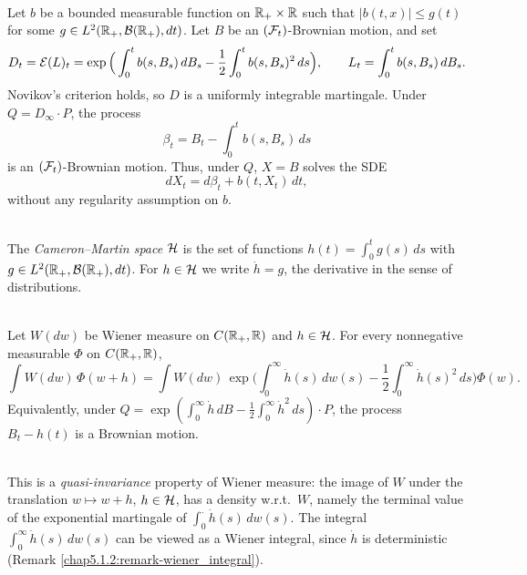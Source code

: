 \begin{proposition}\label{chap5.6:proposition-SDE_construction}
\\
Let $b$ be a bounded measurable function on $\mathbb{R}_+\times\mathbb{R}$ such that $|b(t,x)|\leq g(t)$ for some $g\in L^2(\mathbb{R}_+,\mathcal{B}(\mathbb{R}_+),dt)$. Let $B$ be an $(\mathcal{F}_t)$-Brownian motion, and set
$$D_t=\mathcal{E}(L)_t=\exp\Big(\int_0^tb(s,B_s)\,dB_s-\frac12\int_0^tb(s,B_s)^2\,ds\Big),\qquad L_t=\int_0^tb(s,B_s)\,dB_s.$$
Novikov's criterion holds, so $D$ is a uniformly integrable martingale. Under $Q=D_\infty\cdot P$, the process
$$\beta_t=B_t-\int_0^tb(s,B_s)\,ds$$
is an $(\mathcal{F}_t)$-Brownian motion. Thus, under $Q$, $X=B$ solves the SDE
$$dX_t=d\beta_t+b(t,X_t)\,dt,$$
without any regularity assumption on $b$.
\end{proposition}

\begin{definition}\label{chap5.6:definition-cameron_martin_space}
\\
The \textit{Cameron--Martin space} $\mathcal{H}$ is the set of functions $h(t)=\int_0^tg(s)\,ds$ with $g\in L^2(\mathbb{R}_+,\mathcal{B}(\mathbb{R}_+),dt)$. For $h\in\mathcal{H}$ we write $\dot h=g$, the derivative in the sense of distributions.
\end{definition}

\begin{proposition}\label{chap5.6:proposition-cameron_martin}
\\
Let $W(dw)$ be Wiener measure on $C(\mathbb{R}_+,\mathbb{R})$ and $h\in\mathcal{H}$. For every nonnegative measurable $\Phi$ on $C(\mathbb{R}_+,\mathbb{R})$,
$$\int W(dw)\,\Phi(w+h)=\int W(dw)\,\exp\Big(\int_0^\infty\dot h(s)\,dw(s)-\frac12\int_0^\infty\dot h(s)^2\,ds\Big)\Phi(w).$$
Equivalently, under $Q=\exp(\int_0^\infty\dot h\,dB-\frac12\int_0^\infty\dot h^2\,ds)\cdot P$, the process $B_t-h(t)$ is a Brownian motion.
\end{proposition}

\begin{remark}
\\
This is a \textit{quasi-invariance} property of Wiener measure: the image of $W$ under the translation $w\mapsto w+h$, $h\in\mathcal{H}$, has a density w.r.t.\ $W$, namely the terminal value of the exponential martingale of $\int_0^\cdot\dot h(s)\,dw(s)$. The integral $\int_0^\infty\dot h(s)\,dw(s)$ can be viewed as a Wiener integral, since $\dot h$ is deterministic (Remark \ref{chap5.1.2:remark-wiener_integral}).
\end{remark}

